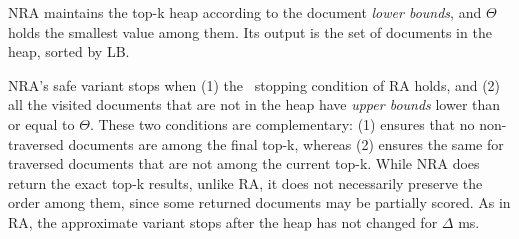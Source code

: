 NRA maintains the top-k heap according to the document \emph{lower bounds}, and $\Theta$ holds the smallest value among them. 
Its output is the set of documents in the heap, sorted by LB.

NRA's safe variant stops when (1) the \RAStop\ stopping condition of RA holds, 
and (2) all the  visited documents that are not in the heap have \emph{upper bounds} lower than or equal to $\Theta$. These two conditions are complementary: (1) ensures that no non-traversed documents are among the final top-k, whereas (2) ensures the same for  traversed documents that are not among the current top-k. 
While NRA does return the exact top-k results, unlike RA, it does not necessarily preserve the order among them, since some returned documents may be partially scored. As in RA, the approximate variant  stops after the heap has not changed for $\Delta$ ms.

